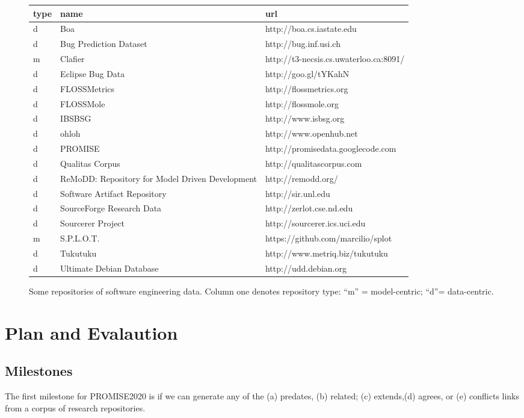 \documentclass[journal]{IEEEtran}
\begin{document}
\begin{figure*} 
\begin{center}
\footnotesize\begin{tabular}{lll} 
type & name & url\\\hline
d&Boa & http://boa.cs.iastate.edu\\
d&Bug Prediction Dataset &http://bug.inf.usi.ch \\
m&Clafier & http://t3-necsis.cs.uwaterloo.ca:8091/\\
d&Eclipse Bug Data &http://goo.gl/tYKahN \\
d&FLOSSMetrics& http://flossmetrics.org \\
d&FLOSSMole &http://flossmole.org \\
d&IBSBSG& http://www.isbsg.org \\
d&ohloh& http://www.openhub.net \\
d&PROMISE &http://promisedata.googlecode.com \\
d&Qualitas Corpus &http://qualitascorpus.com \\
d&ReMoDD: Repository for Model Driven Development &http://remodd.org/\\
d&Software Artifact Repository &http://sir.unl.edu \\
d&SourceForge Research Data &http://zerlot.cse.nd.edu \\
d&Sourcerer Project &http://sourcerer.ics.uci.edu \\
m& S.P.L.O.T.& https://github.com/marcilio/splot\\
d&Tukutuku &http://www.metriq.biz/tukutuku \\
d&Ultimate Debian Database &http://udd.debian.org\\ 
\end{tabular}
\end{center}
\caption{Some repositories of software engineering data. Column one denotes repository type: ``m'' = model-centric; ``d''= data-centric.}\label{fig:sedata}
\end{figure*}


\section{Plan and Evalaution}
\subsection{Milestones}
The first milestone for PROMISE2020 is if we can generate any of the (a)  predates,  (b)  related;  (c)  extends,(d)  agrees,  or  (e)  conflicts links from a  corpus of research repositories.
\end{document}

